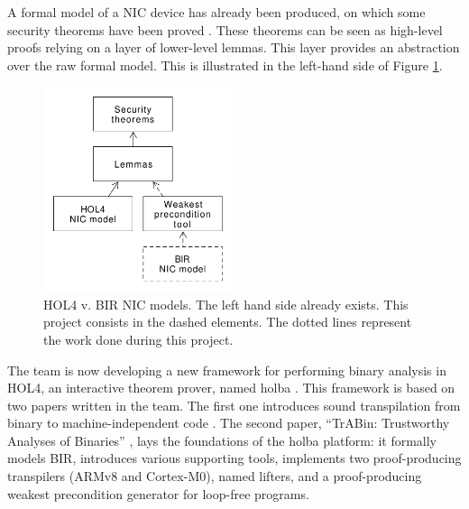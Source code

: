 \documentclass{kththesis}
\begin{document}
A formal model of a \gls{NIC} device has already been produced, on
which some security theorems have been proved
\cite{haglund_formal_2016}. These theorems can be seen as high-level
proofs relying on a layer of lower-level lemmas.
This layer provides an abstraction over the raw formal model. This is illustrated in the left-hand side of Figure \ref{hol-v-bir-nic-model-simple}.

\begin{figure}[ht]
	\includegraphics[height=6cm]{figures/hol-v-bir-nic-model-simple.png}
	\centering
	\caption{HOL4 v. BIR NIC models. The left hand side already exists. This project consists in the dashed elements. The dotted lines represent the work done during this project.}
	\label{hol-v-bir-nic-model-simple}
\end{figure}

The team is now developing a new framework for performing binary analysis in HOL4, an interactive theorem prover, named \gls{holba} \cite{noauthor_holba_2019}. This framework is based on two papers written in the team. The first one introduces sound \gls{transpilation} from binary to machine-independent code \footnotemark \cite{metere_sound_2017}. The second paper, ``TrABin: Trustworthy Analyses of Binaries'' \cite{lindner_trabin:_2019}, lays the foundations of the \gls{holba} platform: it formally models \gls{BIR}, introduces various supporting tools, implements two \gls{proof-producing} \glspl{transpiler} (ARMv8 and Cortex-M0), named lifters, and a proof-producing weakest precondition generator for loop-free programs.

\end{document}
